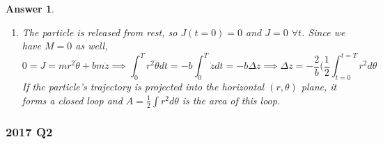 \documentclass[a4paper]{article}
\newtheorem{ans}{Answer}[section]
\theoremstyle{new}
\begin{document}
\begin{ans}
\begin{enumerate}[label=(\alph*)]
Hence, the following quantity is conserved:
$$J=\frac{\partial\mathcal{L}}{\partial\dot{\theta}_B}+\frac{\partial\mathcal{L}}{\partial\dot{\theta}}+b\frac{\partial\mathcal{L}}{\partial\dot{z}}=M(a^2+b^2)\dot{\theta}_B+mr^2\dot{\theta}+bm\dot{z}$$
\item The particle is released from rest, so $J(t=0)=0$ and $J=0$ $\forall t$. Since we have $M=0$ as well,
$$0=J=mr^2\dot{\theta}+bm\dot{z}\implies\int_0^Tr^2\dot{\theta}dt=-b\int_0^T\dot{z}dt=-b\Delta z\implies\Delta z=-\frac{2}{b}\bigg(\frac{1}{2}\int_{t=0}^{t=T}r^2d\theta$$
If the particle's trajectory is projected into the horizontal $(r,\theta)$ plane, it forms a closed loop and $A=\frac{1}{2}\int r^2d\theta$ is the area of this loop.
\end{enumerate}
\end{ans}
\newpage
\subsubsection*{2017 Q2}
\end{document}
